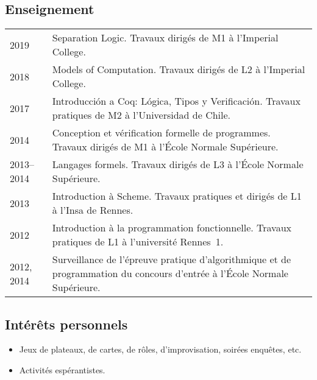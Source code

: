 \documentclass[12pt,a4paper]{article}
\makeatletter
\newcommand{\en}[1]{\foreignlanguage{english}{{#1}}}
\newcommand{\es}[1]{\foreignlanguage{spanish}{{#1}}}
\newcommand{\en}[1]{\foreignlanguage{english}{{#1}}}
\newcommand{\es}[1]{\foreignlanguage{spanish}{{#1}}}
\newenvironment{datecvsection}[1]%
               {\subsection*{#1}%
                 \noindent \begin{tabular}{@{}p{\annee}p{\texte}@{}}}
               {\end{tabular}}
\newenvironment{itemcvsection}[1]%
               {\subsection*{#1}\begin{itemize}}
               {\end{itemize}}
\newcommand\placeName{}
\makeatother
\begin{document}
\begin{datecvsection}{Enseignement}

    2019 & Separation Logic. Travaux dirigés de M1 à l’\en{\placeName{Imperial College}}. \\

    2018 & Models of Computation. Travaux dirigés de L2 à l’\en{\placeName{Imperial College}}. \\

    2017 & Introducción a Coq: Lógica, Tipos y Verificación. Travaux pratiques de M2 à l’\es{\placeName{Universidad de Chile}}. \\

    2014 & Conception et vérification formelle de programmes. Travaux dirigés de M1 à l’\placeName{École Normale Supérieure}. \\

    2013–2014 & Langages formels. Travaux dirigés de L3 à l’\placeName{École Normale Supérieure}. \\

    2013 & Introduction à Scheme. Travaux pratiques et dirigés de L1 à l’\placeName{Insa} de \placeName{Rennes}. \\

    2012 & Introduction à la programmation fonctionnelle. Travaux pratiques de L1 à l’université \placeName{Rennes}~1. \\

    2012, 2014 & Surveillance de l’épreuve pratique d’algorithmique et de programmation du concours d’entrée à l’\placeName{École Normale Supérieure}.

\end{datecvsection}

\begin{itemcvsection}{Intérêts personnels}

  \item Jeux de plateaux, de cartes, de rôles, d’improvisation, soirées enquêtes, etc.
  \item Activités espérantistes.

\end{itemcvsection}
\end{document}

